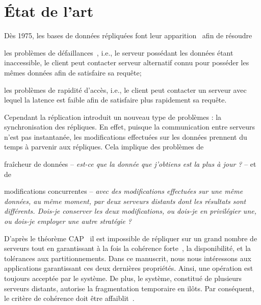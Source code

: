 

\section{État de l'art}
\label{repl:sec:stateoftheart}

Dès 1975, les bases de données répliquées font leur
apparition~\cite{johnson1975maintenance} afin de résoudre
\begin{inparaenum}[(i)]
\item les problèmes de défaillances~\cite{alsberg1976principle}, i.e., le
  serveur possédant les données étant inaccessible, le client peut contacter
  serveur alternatif connu pour posséder les mêmes données afin de satisfaire sa
  requête;
\item les problèmes de rapidité d'accès, i.e., le client peut contacter un
  serveur avec lequel la latence est faible afin de satisfaire plus rapidement
  sa requête.
\end{inparaenum}

Cependant la réplication introduit un nouveau type de problèmes : la
synchronisation des répliques. En effet, puisque la communication entre serveurs
n'est pas instantanée, les modifications effectuées sur les données prennent du
temps à parvenir aux répliques. Cela implique des problèmes de
\begin{inparaenum}[(i)]
\item fraîcheur de données -- \emph{est-ce que la donnée que j'obtiens est la
    plus à jour ?} -- et de
\item modifications concurrentes -- \emph{avec des modifications effectuées sur
    une même données, au même moment, par deux serveurs distants dont les
    résultats sont différents. Dois-je conserver les deux modifications, ou
    dois-je en privilégier une, ou dois-je employer une autre stratégie ?}
\end{inparaenum}


D'après le théorème CAP~\cite{brewer2012cap, gilbert2002brewer} il est
impossible de répliquer sur un grand nombre de serveurs tout en garantissant à
la fois la cohérence forte~\cite{herlihy1990linearizability}, la disponibilité,
et la tolérances aux partitionnements. Dans ce manuscrit, nous nous intéressons
aux applications garantissant ces deux dernières propriétés. Ainsi, une
opération est toujours acceptée par le système. De plus, le système, constitué
de plusieurs serveurs distants, autorise la fragmentation temporaire en
ilôts. Par conséquent, le critère de cohérence doit être
affaiblit~\cite{bailis2013eventual, shapiro2011conflict}.


